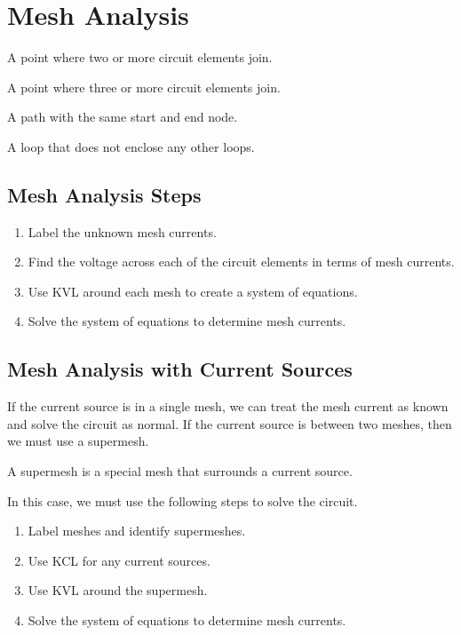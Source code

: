 \documentclass{article}
\begin{document}
\section{Mesh Analysis}
\begin{definition}[Node]
    A point where two or more circuit elements join.
\end{definition}
\begin{definition}
    A point where three or more circuit elements join.
\end{definition}
\begin{definition}[Loop]
    A path with the same start and end node.
\end{definition}
\begin{definition}[Mesh]
    A loop that does not enclose any other loops.
\end{definition}
\subsection{Mesh Analysis Steps}
\begin{enumerate}
    \item Label the unknown mesh currents.
    \item Find the voltage across each of the circuit elements in terms
          of mesh currents.
    \item Use KVL around each mesh to create a system of equations.
    \item Solve the system of equations to determine mesh currents.
\end{enumerate}
\subsection{Mesh Analysis with Current Sources}
If the current source is in a single mesh, we can treat the mesh
current as known and solve the circuit as normal. If the current source
is between two meshes, then we must use a supermesh.
\begin{definition}[Supermesh]
    A supermesh is a special mesh that surrounds a current source.
\end{definition}
In this case, we must use the following steps to solve the circuit.
\begin{enumerate}
    \item Label meshes and identify supermeshes.
    \item Use KCL for any current sources.
    \item Use KVL around the supermesh.
    \item Solve the system of equations to determine mesh currents.
\end{enumerate}
\newpage
\end{document}

